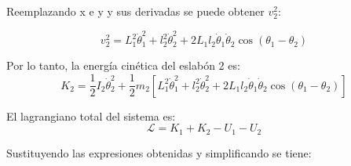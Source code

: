 Reemplazando x e y y sus derivadas se puede obtener $v_2^2$:



\begin{equation}
v_2^2 = L_1^2\dot{\theta}_1^2 + l_2^2\dot{\theta}_2^2 + 2L_1l_2\dot{\theta}_1\dot{\theta}_2\cos(\theta_1 - \theta_2)
\end{equation}

Por lo tanto, la energía cinética del eslabón 2 es:
\begin{equation}
K_2 = \frac{1}{2}I_2\dot{\theta}_2^2 + \frac{1}{2}m_2\left[L_1^2\dot{\theta}_1^2 + l_2^2\dot{\theta}_2^2 + 2L_1l_2\dot{\theta}_1\dot{\theta}_2\cos(\theta_1 - \theta_2)\right]
\end{equation}

El lagrangiano total del sistema es:
\begin{equation}
\mathcal{L} = K_1 + K_2 - U_1 - U_2
\end{equation}

Sustituyendo las expresiones obtenidas y simplificando se tiene:

